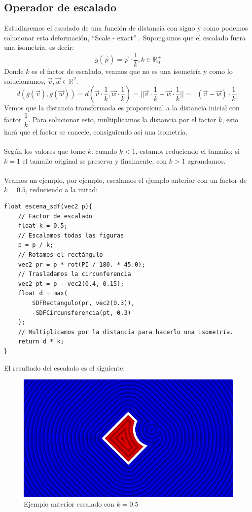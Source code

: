 \subsection{Operador de escalado}
Estudiaremos el escalado de una función de distancia con signo y como podemos solucionar esta deformación, \enquote{Scale - exact} \cite{3ddistinigo}. Supongamos que el escalado fuera una isometría, es decir:
\[g(\Vec{p})=\Vec{p}\cdot \dfrac{1}{k}, k \in \mathbb{R}^{+}_{0}\]
Donde \(k\) es el factor de escalado, veamos que no es una isometría y como lo solucionamos, \(\Vec{v},\Vec{w}\in \mathbb{R}^2\).
\[d(g(\Vec{v}),g(\Vec{w}))=d\left(\Vec{v}\cdot \dfrac{1}{k}, \Vec{w}\cdot \dfrac{1}{k}\right) = \vert\vert \Vec{v}\cdot \dfrac{1}{k} - \Vec{w}\cdot \dfrac{1}{k}\vert\vert=\vert\vert (\Vec{v} - \Vec{w})\cdot \dfrac{1}{k}\vert\vert\]
Vemos que la distancia transformada es proporcional a la distancia inicial con factor \(\dfrac{1}{k}\). Para solucionar esto, multiplicamos la distancia por el factor \(k\), esto hará que el factor se cancele, consiguiendo así una isometría.\\\\
Según los valores que tome \(k\): cuando \(k<1\), estamos reduciendo el tamaño; si \(k=1\) el tamaño original se preserva y finalmente, con \(k>1\) agrandamos.\\\\
Veamos un ejemplo, por ejemplo, escalamos el ejemplo anterior con un factor de \(k=0.5\), reduciendo a la mitad:
\begin{lstlisting}
float escena_sdf(vec2 p){
    // Factor de escalado
    float k = 0.5;
    // Escalamos todas las figuras
    p = p / k;
    // Rotamos el rectángulo
    vec2 pr = p * rot(PI / 180. * 45.0);
    // Trasladamos la circunferencia
    vec2 pt = p - vec2(0.4, 0.15);
    float d = max(
        SDFRectangulo(pr, vec2(0.3)),
        -SDFCircunsferencia(pt, 0.3)
    );
    // Multiplicamos por la distancia para hacerlo una isometría.
    return d * k;
}
\end{lstlisting}

El resultado del escalado es el siguiente:

\begin{figure}[H]
  \centering
  \captionsetup{justification=centering}%
  \includegraphics[width=1.0\textwidth]{secciones/imagenes/sdf/2d/sdf_subtracted_scale.png}
  \caption{Ejemplo anterior escalado con \(k=0.5\)}
  \label{fig:substraction}
\end{figure}


